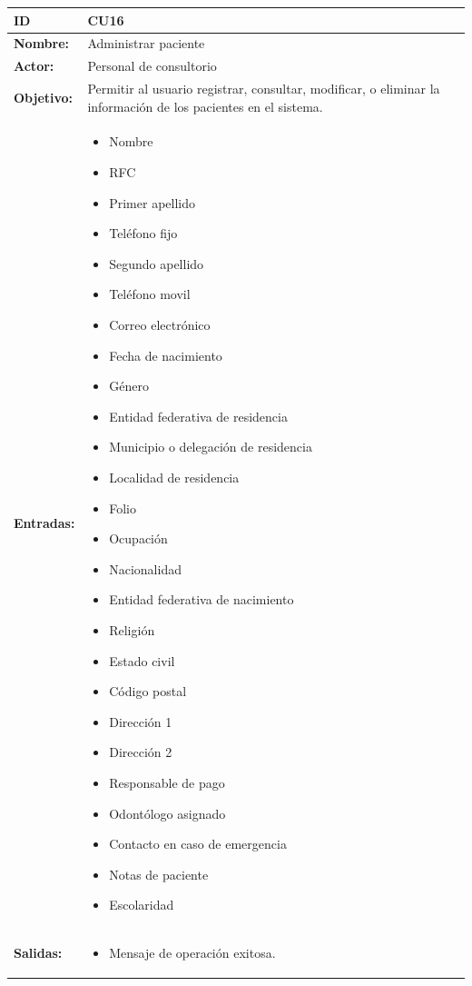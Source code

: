 \begin{longtable}[H]{|p{}|p{12cm}|}
\hline\textbf{ID}         
& \textbf{CU16}            \\ \hline
\textbf{Nombre:}          
& Administrar paciente       \\ \hline
\textbf{Actor:}          
& Personal de consultorio   \\ \hline
\textbf{Objetivo:}       
& Permitir al usuario registrar, consultar, modificar, o eliminar la información de los pacientes en el sistema.\\ \hline
\textbf{Entradas:}  &             
\begin{itemize}[nosep]
\item Nombre
\item RFC
\item Primer apellido
\item Teléfono fijo
\item Segundo apellido
\item Teléfono movil
\item Correo electrónico
\item Fecha de nacimiento
\item Género
\item Entidad federativa de residencia
\item Municipio o delegación de residencia
\item Localidad de residencia
\item Folio
\item Ocupación
\item Nacionalidad
\item Entidad federativa de nacimiento
\item Religión
\item Estado civil
\item Código postal
\item Dirección 1
\item Dirección 2
\item Responsable de pago
\item Odontólogo asignado
\item Contacto en caso de emergencia
\item Notas de paciente
\item Escolaridad
\end{itemize}
\\ \hline
\textbf{Salidas:}  &             
\begin{itemize}[nosep]
\item Mensaje de operación exitosa.
\end{itemize}

\end{longtable}
